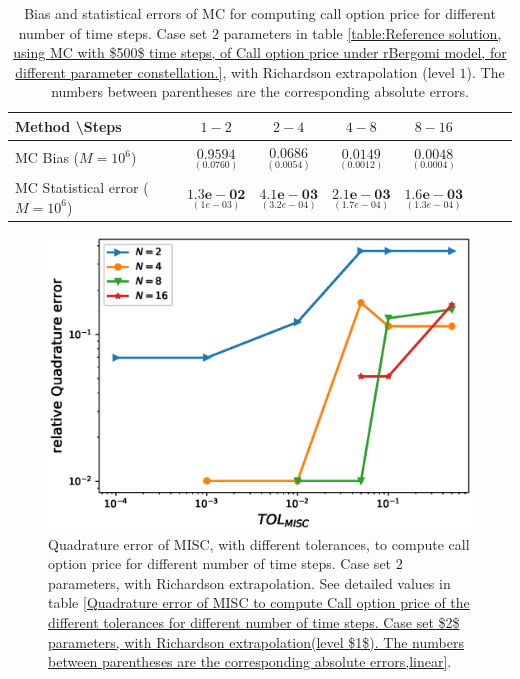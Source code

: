 \begin{table}[h!]
	\centering
	\begin{tabular}{l*{6}{c}r}
		Method \textbackslash  Steps            & $1-2$ & $2-4$ & $4-8$ & $8-16$  \\
		\hline
		MC Bias ($M=10^6$)  &$\underset{( 0.0760)}{\mathbf{0.9594}}$  & $\underset{( 0.0054)}{\mathbf{0.0686}}$  & $\underset{(   0.0012)}{\mathbf{0.0149}}$  & $\underset{(  0.0004)}{\mathbf{0.0048}}$ \\	
		
		MC Statistical error ($M=10^6$)   & $\underset{( 1e-03)}{\mathbf{1.3e-02}}$  & $\underset{(   3.2e-04)}{\mathbf{4.1e-03}}$  & $\underset{(  1.7e-04)}{\mathbf{2.1e-03}}$ & $\underset{(  1.3e-04)}{\mathbf{1.6e-03}}$ \\	
		\hline
	\end{tabular}
	\caption{Bias and statistical errors of MC   for computing call option price  for different number of time steps. Case set $2$ parameters in table \ref{table:Reference solution, using MC with $500$ time steps, of Call option price under rBergomi model, for different parameter constellation.}, with Richardson extrapolation (level $1$). The numbers between parentheses are the corresponding absolute errors.}
	\label{Bias and Statistical errors of MC ($M=10^6$)  for computing Call option price  for different number of time steps. Case set $2$ parameters, with Richardson extrapolation (level1). The numbers between parentheses are the corresponding absolute errors.}
\end{table}


\FloatBarrier





\begin{figure}[h!]
	\centering
	\includegraphics[width=0.4\linewidth]{./figures/rBergomi_MISC_quadratre_error/vs_TOL/set2/relative_quad_error_wrt_MISC_TOL_set2_with_rich_linear}
	
	
	\caption{Quadrature error of MISC, with different tolerances,  to compute call option price for different number of time steps. Case  set $2$ parameters, with Richardson extrapolation.  See detailed values  in table \ref{Quadrature error of MISC to compute Call option price of the different tolerances for different number of time steps. Case set $2$ parameters, with Richardson extrapolation(level $1$). The numbers between parentheses are the corresponding absolute errors,linear}.}
	\label{fig:Quadrature_error_set2_linear_rich}
\end{figure}


